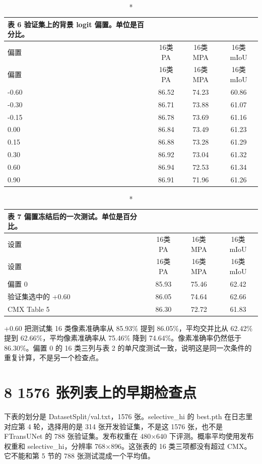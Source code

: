 \documentclass[11pt]{article}
\begin{document}
{\footnotesize\setlength{\tabcolsep}{3pt}
\begin{longtable}{lccc}
\caption*{表 6  验证集上的背景 logit 偏置。单位是百分比。}\\
\toprule
偏置 & 16类 PA & 16类 MPA & 16类 mIoU\\
\midrule
\endfirsthead
\toprule
偏置 & 16类 PA & 16类 MPA & 16类 mIoU\\
\midrule
\endhead
-0.60 & 86.52 & 74.23 & 60.86\\
-0.30 & 86.71 & 73.88 & 61.07\\
-0.15 & 86.78 & 73.69 & 61.16\\
0.00 & 86.84 & 73.49 & 61.23\\
0.15 & 86.88 & 73.28 & 61.29\\
0.30 & 86.92 & 73.04 & 61.32\\
0.60 & 86.94 & 72.53 & 61.34\\
0.90 & 86.91 & 71.96 & 61.26\\
\bottomrule
\end{longtable}
}
{\footnotesize\setlength{\tabcolsep}{3pt}
\begin{longtable}{lccc}
\caption*{表 7  偏置冻结后的一次测试。单位是百分比。}\\
\toprule
设置 & 16类 PA & 16类 MPA & 16类 mIoU\\
\midrule
\endfirsthead
\toprule
设置 & 16类 PA & 16类 MPA & 16类 mIoU\\
\midrule
\endhead
偏置 0 & 85.93 & 75.46 & 62.42\\
验证集选中的 +0.60 & 86.05 & 74.64 & 62.66\\
CMX Table 5 & 86.30 & 72.72 & 61.83\\
\bottomrule
\end{longtable}
}
+0.60 把测试集 16 类像素准确率从 85.93\% 提到 86.05\%，平均交并比从 62.42\% 提到 62.66\%，平均像素准确率从 75.46\% 降到 74.64\%。像素准确率仍然低于 86.30\%。偏置 0 的 16 类三列与表 2 的单尺度测试一致，说明这是同一次条件的重复计算，不是另一个检查点。

\section*{8  1576 张列表上的早期检查点}
下表的划分是 DatasetSplit/val.txt，1576 张。selective\_hi 的 best.pth 在日志里对应第 4 轮，选择用的是 314 张开发验证集，不是这 1576 张，也不是 FTransUNet 的 788 张验证集。发布权重在 480×640 下评测。概率平均使用发布权重和 selective\_hi，分辨率 768×896。这张表的 16 类三项都没有超过 CMX。它不能和第 5 节的 788 张测试混成一个平均值。
\end{document}
